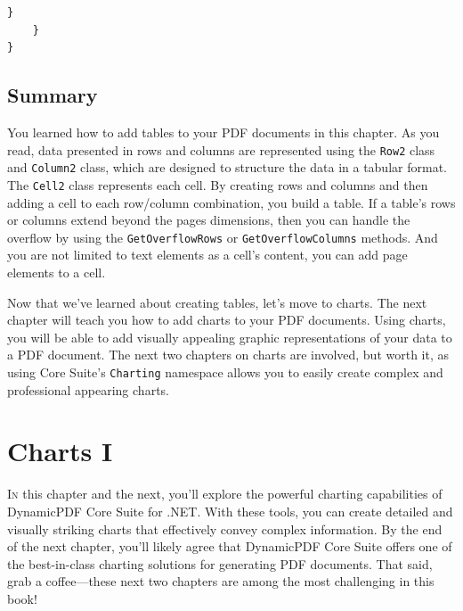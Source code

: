 \documentclass[american,letterpaper]{tufte-book}
\numberwithin{equation}{section}
\numberwithin{figure}{section}
\def\color#1{}%
\begin{document}
{\begin{lstlisting}[caption={Using AutoLayout to create a PDF document.},label={lis:autolayout-table},basicstyle={\small\ttfamily},breaklines=true]
        }
    }
}
\end{lstlisting}
\leavevmode\egroup

\section{Summary}

You learned how to add tables to your PDF documents in this chapter.
As you read, data presented in rows and columns are represented using
the \texttt{Row2} class and \texttt{Column2} class, which are designed
to structure the data in a tabular format. The \texttt{Cell2} class
represents each cell. By creating rows and columns and then adding
a cell to each row/column combination, you build a table. If a table's
rows or columns extend beyond the pages dimensions, then you can handle
the overflow by using the \texttt{GetOverflowRows} or \texttt{GetOverflowColumns}
methods. And you are not limited to text elements as a cell's content,
you can add page elements to a cell. 

Now that we've learned about creating tables, let's move to charts.
The next chapter will teach you how to add charts to your PDF documents.
Using charts, you will be able to add visually appealing graphic representations
of your data to a PDF document. The next two chapters on charts are
involved, but worth it, as using Core Suite's \texttt{Charting} namespace
allows you to easily create complex and professional appearing charts. 

\color{white}
\chapter{Charts I}\label{chap:Charts}
\color{black}
\BgThispage
\vspace{8.00em}
\lettrine[lines=2,lhang=0.1]{I}{n} this chapter and the next, you’ll explore the powerful charting capabilities of DynamicPDF Core Suite for .NET. With these tools, you can create detailed and visually striking charts that effectively convey complex information. By the end of the next chapter, you’ll likely agree that DynamicPDF Core Suite offers one of the best-in-class charting solutions for generating PDF documents. That said, grab a coffee—these next two chapters are among the most challenging in this book!

}
\end{document}
